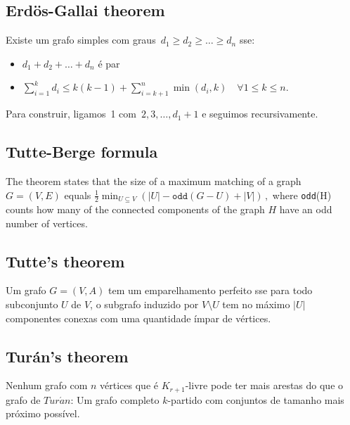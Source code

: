 \subsection{Erdös-Gallai theorem}
Existe um grafo simples com graus~$d_1 \geq d_2 \geq \ldots \geq d_n$ sse:
\begin{itemize}
\item $d_1 + d_2 + \ldots + d_n$ é par
\item $\sum\limits_{i = 1}^k{d_i} \leq k(k-1) + \sum\limits_{i=k+1}^n{\min(d_i, k)} \quad \forall 1 \leq k \leq n$.
\end{itemize}
Para construir, ligamos~1 com~$2, 3, \ldots, d_1 + 1$ e seguimos recursivamente.\newline


\iffalse
\subsection{Synchronizing word problem}
A DFA has a synchronizing word (an input sequence that moves all states
to the same state) iff.\ each pair of states has a synchronizing word.
That can be checked using reverse DFS over pairs of states. Finding the
shortest synchronizing word is NP-complete.
\fi

\subsection{Tutte-Berge formula}
The theorem states that the size of a maximum matching of a graph $G=(V,E)$ equals ${\frac {1}{2}}\min _{U\subseteq V}\left(|U|- \texttt{odd}(G-U)+|V|\right)\,,$ where \texttt{odd}(H) counts how many of the connected components of the graph $H$ have an odd number of vertices.

\subsection{Tutte's theorem}
Um grafo $G = (V, A)$ tem um emparelhamento perfeito sse para todo subconjunto $U$ de $V$, o subgrafo induzido por $V \setminus U$ tem no máximo $|U|$ componentes conexas com uma quantidade ímpar de vértices.

\subsection{Turán's theorem} 
Nenhum grafo com $n$ vértices que é $K_{r+1}$-livre pode ter mais arestas do que o grafo de $Tur\acute{a}n$: Um grafo completo $k$-partido com conjuntos de tamanho mais próximo possível.



